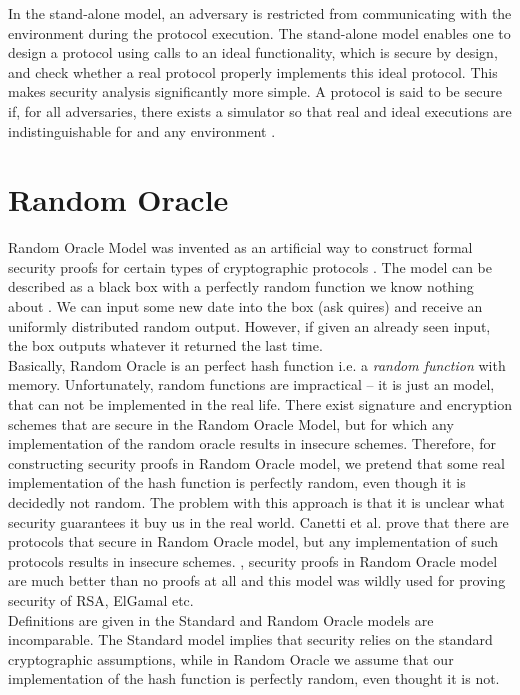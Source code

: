 In the stand-alone model, an adversary is restricted from communicating with the environment during the protocol execution. The stand-alone model enables one to design a protocol using calls to an ideal functionality, which is secure by design,  and check whether a real protocol properly implements this ideal protocol. This makes security analysis significantly more simple. A protocol is said to be secure if, for all adversaries, there exists a simulator so that real and ideal executions are indistinguishable for and any environment \cite{Lindell2016}. 
\section{Random Oracle}
\label{rom}
Random Oracle Model was invented as an artificial  way to construct formal security proofs for certain types of cryptographic protocols \cite{Bellare1993}. The model can be described as a black box with a perfectly random function we know nothing about . We can input some new date into the box (ask quires) and receive an uniformly distributed random output. However, if given an already seen input, the box outputs whatever it returned the last time. \\

Basically, Random Oracle is an perfect hash function i.e. a \textit{random function} with memory. Unfortunately, random functions are impractical -- it is just an model, that can not be implemented in the real life. There exist signature and encryption schemes that are secure in the Random Oracle Model, but for which any implementation of the random oracle results in insecure schemes. Therefore, for constructing security proofs in Random Oracle model, we pretend that some real implementation of the hash function is perfectly random, even though it is decidedly not random. The problem with this approach is that it is unclear what security guarantees it buy us in the real world. Canetti et al. \cite{Canetti2004} prove that there are protocols that secure in Random Oracle model, but any implementation of such protocols results in insecure schemes. , security proofs in Random Oracle model are much better than no proofs at all and this model was wildly used for proving security of RSA, ElGamal etc.\\

Definitions are given in the Standard and Random Oracle models are incomparable. The Standard model implies that security relies on the standard cryptographic assumptions, while in Random Oracle we assume that our implementation of the hash function is perfectly random, even thought it is not. 
